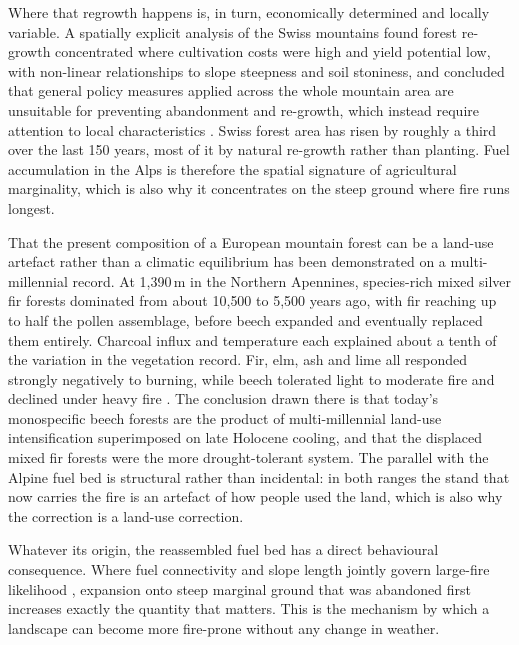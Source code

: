 \documentclass[11pt,a4paper]{article}
\begin{document}
Where that regrowth happens is, in turn, economically determined and locally variable. A spatially explicit analysis of the Swiss mountains found forest re-growth concentrated where cultivation costs were high and yield potential low, with non-linear relationships to slope steepness and soil stoniness, and concluded that general policy measures applied across the whole mountain area are unsuitable for preventing abandonment and re-growth, which instead require attention to local characteristics \citep{gellrich_agricultural_2007}. Swiss forest area has risen by roughly a third over the last 150 years, most of it by natural re-growth rather than planting. Fuel accumulation in the Alps is therefore the spatial signature of agricultural marginality, which is also why it concentrates on the steep ground where fire runs longest.

That the present composition of a European mountain forest can be a land-use artefact rather than a climatic equilibrium has been demonstrated on a multi-millennial record. At 1{,}390\,m in the Northern Apennines, species-rich mixed silver fir forests dominated from about 10{,}500 to 5{,}500 years ago, with fir reaching up to half the pollen assemblage, before beech expanded and eventually replaced them entirely. Charcoal influx and temperature each explained about a tenth of the variation in the vegetation record. Fir, elm, ash and lime all responded strongly negatively to burning, while beech tolerated light to moderate fire and declined under heavy fire \citep{moralesmolino_longterm_2021}. The conclusion drawn there is that today's monospecific beech forests are the product of multi-millennial land-use intensification superimposed on late Holocene cooling, and that the displaced mixed fir forests were the more drought-tolerant system. The parallel with the Alpine fuel bed is structural rather than incidental: in both ranges the stand that now carries the fire is an artefact of how people used the land, which is also why the correction is a land-use correction.

Whatever its origin, the reassembled fuel bed has a direct behavioural consequence. Where fuel connectivity and slope length jointly govern large-fire likelihood \citep{conedera_linking_2024}, expansion onto steep marginal ground that was abandoned first increases exactly the quantity that matters. This is the mechanism by which a landscape can become more fire-prone without any change in weather.
\end{document}
